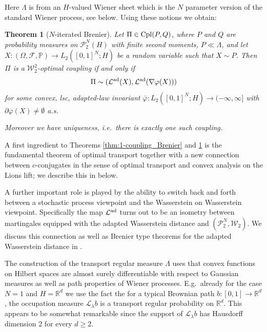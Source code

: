\documentclass[a4paper]{amsart}
\newtheorem{theorem}{Theorem}
\numberwithin{theorem}{section}
\theoremstyle{definition}
\newcommand{\R}{\mathbb{R}}
\newcommand{\law}{\mathcal{L}}
\newcommand{\cpl}{\textup{Cpl}}
\newcommand{\W}{\mathcal{W}}
\newcommand{\Pc}{\mathcal P}
\renewcommand{\phi}{\varphi}
\newcommand{\lawad}{\law^{\textup{ad}}}
\begin{document}
Here $\Lambda $ is from an $H$-valued Wiener sheet  which is the $N$ parameter version of the standard Wiener process, see  below. Using these notions we obtain: 


 \begin{theorem}[$N$-iterated Brenier]\label{thm:N-coupling_Brenier} 
Let $\Pi \in \cpl(P,Q)$, where $P$ and $Q$ are probability measures on $\mathcal{P}_2^N(H)$ with finite second moments, $P \ll \Lambda$, and let $X:(\Omega,\mathcal{F},\mathbb{P}) \to L_2([0,1]^N; H)$ be a random variable such that $X \sim P$.
Then $\Pi$ is a $\W_2^2$-optimal coupling if and only if 
\begin{align}
\Pi \sim (\lawad  (X),\lawad (\nabla \phi (X)))
\end{align}
for some convex, lsc, adapted-law invariant
$\bar{\phi}: L_2([0,1]^N; H) \to (-\infty, \infty]$ 
with $\partial \overline\phi(X) \neq \emptyset$ 
a.s.




Moreover we have uniqueness, i.e.\ there is exactly one such coupling.
\end{theorem}

A first ingredient to Theorems \ref{thm:1-coupling_Brenier} and \ref{thm:N-coupling_Brenier} is the fundamental theorem of optimal transport together with a new connection between $c$-conjugates in the sense of optimal transport and convex analysis on the Lions lift; we describe this in  below.


A further important role 
is played by the ability to switch back and forth between a stochastic process viewpoint and the Wasserstein on Wasserstein viewpoint. Specifically the map $\lawad$ turns out to be an isometry between martingales equipped with the adapted Wasserstein distance and $(\Pc_2^N, \W_2)$. We discuss this connection as well as Brenier type theorems for the adapted Wasserstein distance in .


The construction of the transport regular measure $\Lambda$ uses that convex functions on Hilbert spaces are almost surely differentiable with respect to Gaussian measures as well as path properties of Wiener processes. E.g.\ already for the case $N=1$ and $H= \R^d$ we use the fact the for a typical Brownian path $b:[0,1]\to \R^d$, the occupation measure $\law_\lambda b$ is a transport regular probability on $\R^d$. This appears to be somewhat remarkable since the support of $\law_\lambda b$ has Hausdorff dimension 2 for every $d\geq 2$.
\end{document}
